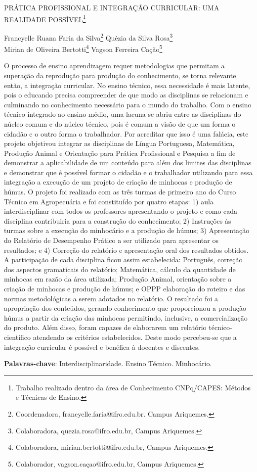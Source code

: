 \documentclass[article,12pt,onesidea,4paper,english,brazil]{abntex2}
\begin{document}
	
	
	\frenchspacing 
	
	\begin{center}
		\LARGE PRÁTICA PROFISSIONAL E INTEGRAÇÃO CURRICULAR: UMA REALIDADE
		POSSÍVEL\footnote{Trabalho realizado dentro da área de Conhecimento CNPq/CAPES: Métodos e Técnicas de Ensino.}
		
		\normalsize
	Francyelle Ruana Faria da Silva\footnote{Coordenadora, francyelle.faria@ifro.edu.br. Campus Ariquemes.} 
	Quézia da Silva Rosa\footnote{Colaboradora, quezia.rosa@ifro.edu.br, Campus Ariquemes.} \\
	Mirian de Oliveira Bertotti\footnote{Colaboradora, mirian.bertotti@ifro.edu.br, Campus Ariquemes.} 
	Vagson Ferreira Cação\footnote{Colaborador, vagson.caçao@ifro.edu.br, Campus Ariquemes.} 
	\end{center}
	
	\noindent O processo de ensino aprendizagem requer metodologias que permitam a
	superação da reprodução para produção do conhecimento, se torna relevante então,
	a integração curricular. No ensino técnico, essa necessidade é mais latente, pois o
	educando precisa compreender de que modo as disciplinas se relacionam e
	culminando no conhecimento necessário para o mundo do trabalho. Com o ensino
	técnico integrado ao ensino médio, uma lacuna se abriu entre as disciplinas do
	núcleo comum e do núcleo técnico, pois é comum a visão de que um forma o
	cidadão e o outro forma o trabalhador. Por acreditar que isso é uma falácia, este
	projeto objetivou integrar as disciplinas de Língua Portuguesa, Matemática,
	Produção Animal e Orientação para Prática Profissional e Pesquisa a fim de
	demonstrar a aplicabilidade de um conteúdo para além dos limites das disciplinas e
	demonstrar que é possível formar o cidadão e o trabalhador utilizando para essa
	integração a execução de um projeto de criação de minhocas e produção de húmus.
	O projeto foi realizado com as três turmas de primeiro ano do Curso Técnico em
	Agropecuária e foi constituído por quatro etapas: 1) aula interdisciplinar com todos
	os professores apresentando o projeto e como cada disciplina contribuiria para a
	construção do conhecimento; 2) Instruções às turmas sobre a execução do
	minhocário e a produção de húmus; 3) Apresentação do Relatório de Desempenho
	Prático a ser utilizado para apresentar os resultados; e 4) Correção do relatório e
	apresentação oral dos resultados obtidos. A participação de cada disciplina ficou
	assim estabelecida: Português, correção dos aspectos gramaticais do relatório;
	Matemática, cálculo da quantidade de minhocas em razão da área utilizada;
	Produção Animal, orientação sobre a criação de minhocas e produção de húmus; e
	OPPP elaboração do roteiro e das normas metodológicas a serem adotados no
	relatório. O resultado foi a apropriação dos conteúdos, gerando conhecimento que
	proporcionou a produção húmus a partir da criação das minhocas permitindo,
	inclusive, a comercialização do produto. Além disso, foram capazes de elaborarem
	um relatório técnico-científico atendendo os critérios estabelecidos. Deste modo
	percebeu-se que a integração curricular é possível e benéfica à docentes e
	discentes.
	
	\vspace{\onelineskip}
	
	\noindent
	\textbf{Palavras-chave}: Interdisciplinaridade. Ensino Técnico. Minhocário.
	
\end{document}
